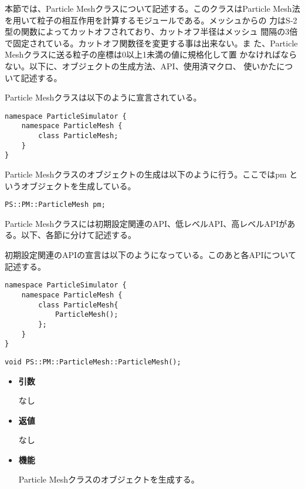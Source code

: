 本節では、Particle Meshクラスについて記述する。このクラスはParticle
Mesh法を用いて粒子の相互作用を計算するモジュールである。メッシュからの
力はS-2型の関数によってカットオフされており、カットオフ半径はメッシュ
間隔の3倍で固定されている。カットオフ関数径を変更する事は出来ない。ま
た、Particle Meshクラスに送る粒子の座標は0以上1未満の値に規格化して置
かなければならない。以下に、オブジェクトの生成方法、API、使用済マクロ、
使いかたについて記述する。


Particle Meshクラスは以下のように宣言されている。
\begin{lstlisting}[caption=ParticleMesh0]
namespace ParticleSimulator {
    namespace ParticleMesh {
        class ParticleMesh;
    }
}
\end{lstlisting}

Particle Meshクラスのオブジェクトの生成は以下のように行う。ここではpm
というオブジェクトを生成している。
\begin{screen}
\begin{verbatim}
PS::PM::ParticleMesh pm;
\end{verbatim}
\end{screen}


Particle Meshクラスには初期設定関連のAPI、低レベルAPI、高レベルAPIがあ
る。以下、各節に分けて記述する。


初期設定関連のAPIの宣言は以下のようになっている。このあと各APIについて
記述する。
\begin{lstlisting}[caption=ParticleMesh1]
namespace ParticleSimulator {
    namespace ParticleMesh {
        class ParticleMesh{
            ParticleMesh();
        };
    }
}
\end{lstlisting}


\begin{screen}
\begin{verbatim}
void PS::PM::ParticleMesh::ParticleMesh();
\end{verbatim}
\end{screen}

\begin{itemize}

\item {\bf 引数}

なし

\item {\bf 返値}

なし

\item {\bf 機能}

Particle Meshクラスのオブジェクトを生成する。

\end{itemize}


